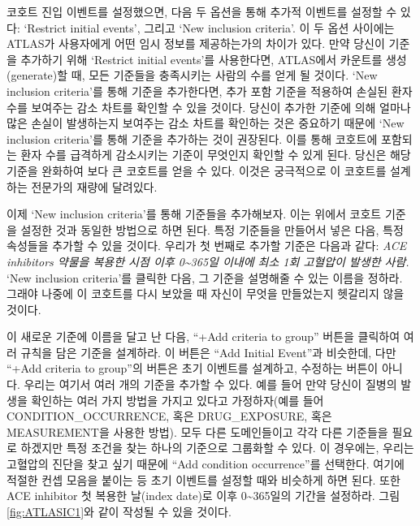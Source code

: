 \documentclass[11pt]{book}
\theoremstyle{definition}
\theoremstyle{definition}
\theoremstyle{definition}
\theoremstyle{remark}
\begin{document}
코호트 진입 이벤트를 설정했으면, 다음 두 옵션을 통해 추가적 이벤트를
설정할 수 있다: `Restrict initial events', 그리고 `New inclusion
criteria'. 이 두 옵션 사이에는 ATLAS가 사용자에게 어떤 임시 정보를
제공하는가의 차이가 있다. 만약 당신이 기준을 추가하기 위해 `Restrict
initial events'를 사용한다면, ATLAS에서 카운트를 생성(generate)할 때,
모든 기준들을 충족시키는 사람의 수를 얻게 될 것이다. `New inclusion
criteria'를 통해 기준을 추가한다면, 추가 포함 기준을 적용하여 손실된
환자 수를 보여주는 감소 차트를 확인할 수 있을 것이다. 당신이 추가한
기준에 의해 얼마나 많은 손실이 발생하는지 보여주는 감소 차트를 확인하는
것은 중요하기 때문에 `New inclusion criteria'를 통해 기준을 추가하는
것이 권장된다. 이를 통해 코호트에 포함되는 환자 수를 급격하게 감소시키는
기준이 무엇인지 확인할 수 있게 된다. 당신은 해당 기준을 완화하여 보다 큰
코호트를 얻을 수 있다. 이것은 궁극적으로 이 코호트를 설계하는 전문가의
재량에 달려있다.

이제 `New inclusion criteria'를 통해 기준들을 추가해보자. 이는 위에서
코호트 기준을 설정한 것과 동일한 방법으로 하면 된다. 특정 기준들을
만들어서 넣은 다음, 특정 속성들을 추가할 수 있을 것이다. 우리가 첫
번째로 추가할 기준은 다음과 같다: \emph{ACE inhibitors 약물을 복용한
시점 이후 0\textasciitilde{}365일 이내에 최소 1회 고혈압이 발생한 사람.}
`New inclusion criteria'를 클릭한 다음, 그 기준을 설명해줄 수 있는
이름을 정하라. 그래야 나중에 이 코호트를 다시 보았을 때 자신이 무엇을
만들었는지 헷갈리지 않을 것이다.

이 새로운 기준에 이름을 달고 난 다음, ``+Add criteria to group'' 버튼을
클릭하여 여러 규칙을 담은 기준을 설계하라. 이 버튼은 ``Add Initial
Event''과 비슷한데, 다만 ``+Add criteria to group''의 버튼은 초기
이벤트를 설계하고, 수정하는 버튼이 아니다. 우리는 여기서 여러 개의
기준을 추가할 수 있다. 예를 들어 만약 당신이 질병의 발생을 확인하는 여러
가지 방법을 가지고 있다고 가정하자(예를 들어 CONDITION\_OCCURRENCE, 혹은
DRUG\_EXPOSURE, 혹은 MEASUREMENT을 사용한 방법). 모두 다른 도메인들이고
각각 다른 기준들을 필요로 하겠지만 특정 조건을 찾는 하나의 기준으로
그룹화할 수 있다. 이 경우에는, 우리는 고혈압의 진단을 찾고 싶기 때문에
``Add condition occurrence''를 선택한다. 여기에 적절한 컨셉 모음을
붙이는 등 초기 이벤트를 설정할 때와 비슷하게 하면 된다. 또한 ACE
inhibitor 첫 복용한 날(index date)로 이후 0\textasciitilde{}365일의
기간을 설정하라. 그림 \ref{fig:ATLASIC1}와 같이 작성될 수 있을 것이다.
\end{document}
